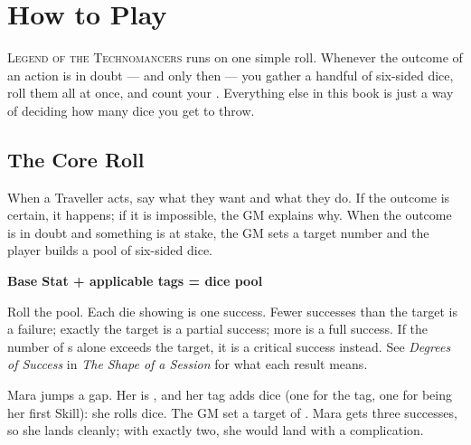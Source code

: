 \chapter{How to Play}
\begin{readaloud}
\lipsum[5][1-3]
\end{readaloud}

\lettrine{L}{egend of the Technomancers} runs on one simple roll. Whenever
the outcome of an action is in doubt --- and only then --- you gather a
handful of six-sided dice, roll them all at once, and count your
. Everything else in this book is just a way of deciding
how many dice you get to throw.


\section{The Core Roll}
When a Traveller acts, say what they want and what they do. If the
outcome is certain, it happens; if it is impossible, the GM explains
why. When the outcome is in doubt and something is at stake, the GM sets
a target number and the player builds a pool of six-sided dice.

\begin{statblock}
\begin{center}
{\large\bfseries Base Stat + applicable tags = dice pool}
\end{center}
Roll the pool. Each die showing  is one success.
Fewer successes than the target is a failure; exactly the target is a
partial success; more is a full success. If the number of s
alone exceeds the target, it is a critical success instead. See
\emph{Degrees of Success} in \emph{The Shape of a Session} for what
each result means.
\end{statblock}

\begin{example}
Mara jumps a gap. Her  is , and her
 tag adds  dice (one for the tag, one
for being her first Skill): she rolls  dice. The GM set a target of . Mara gets three successes, so
she lands cleanly; with exactly two, she would land with a complication.
\end{example}

